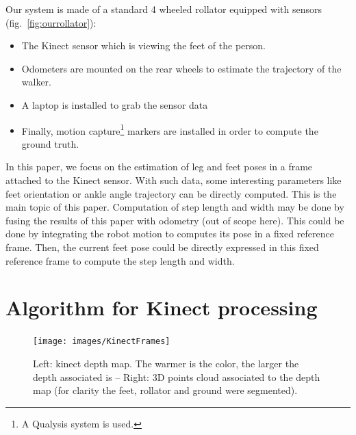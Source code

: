 \documentclass[letterpaper, 10 pt, conference]{ieeeconf}
\newcommand{\CDOK}[2]{{#1}} %
\begin{document}
Our system is made \CDOK{of}{by} a standard \CDOK{4 wheeled rollator}{walker} \CDOK{equipped with sensors}{on which some equipment was installed} (fig.~\ref{fig:ourrollator}):
\begin{itemize}
	\item The Kinect sensor which is viewing the feet of the person.
	\item Odometers \CDOK{are}{were} mounted on the rear wheels to estimate the trajectory of the walker.
	\item A laptop \CDOK{is}{was} installed to grab the sensor data
	\item Finally, motion capture\footnote{A Qualysis system is used.} markers \CDOK{are}{were} installed in order to compute the ground truth. 
\end{itemize}


In this paper, we focus on the estimation of leg and feet poses in a frame attached to the Kinect sensor. With such data, some interesting parameters like feet orientation or ankle angle trajectory can be directly computed. This is the main topic of this paper. Computation of step length and width may be done by fusing the results of this paper with odometry (out of scope here). \CDOK{This could be done by integrating the robot motion to computes its pose in a fixed reference frame. Then, the current feet pose could be directly expressed in this fixed reference frame to compute the step length and width.}{}



\section{Algorithm for Kinect processing}
\label{sec:Algorithm}

\begin{figure}
	\centering
	\texttt{[image: images/KinectFrames]}
	\caption{Left: kinect depth map. The warmer is the color, the larger the depth associated is -- Right: 3D points cloud associated to the depth map (for clarity the feet, rollator and ground were segmented).}
	\label{fig:KinectFrames}
\end{figure}
\end{document}
